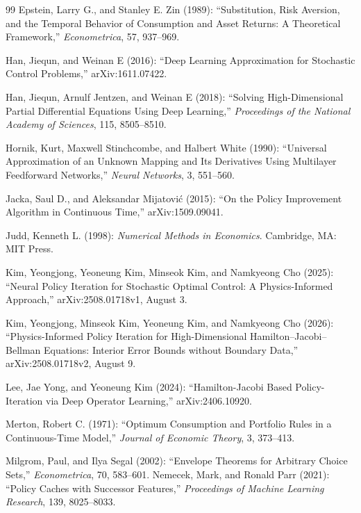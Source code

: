 \begin{thebibliography}{99}
Epstein, Larry G., and Stanley E. Zin (1989): ``Substitution, Risk Aversion, and the Temporal Behavior of Consumption and Asset Returns: A Theoretical Framework,'' \emph{Econometrica}, 57, 937--969.

Han, Jiequn, and Weinan E (2016): ``Deep Learning Approximation for Stochastic Control Problems,'' arXiv:1611.07422.

Han, Jiequn, Arnulf Jentzen, and Weinan E (2018): ``Solving High-Dimensional Partial Differential Equations Using Deep Learning,'' \emph{Proceedings of the National Academy of Sciences}, 115, 8505--8510.

Hornik, Kurt, Maxwell Stinchcombe, and Halbert White (1990): ``Universal Approximation of an Unknown Mapping and Its Derivatives Using Multilayer Feedforward Networks,'' \emph{Neural Networks}, 3, 551--560.

Jacka, Saul D., and Aleksandar Mijatovi\'c (2015): ``On the Policy Improvement Algorithm in Continuous Time,'' arXiv:1509.09041.

Judd, Kenneth L. (1998): \emph{Numerical Methods in Economics}. Cambridge, MA: MIT Press.

Kim, Yeongjong, Yeoneung Kim, Minseok Kim, and Namkyeong Cho (2025): ``Neural Policy Iteration for Stochastic Optimal Control: A Physics-Informed Approach,'' arXiv:2508.01718v1, August 3.

Kim, Yeongjong, Minseok Kim, Yeoneung Kim, and Namkyeong Cho (2026): ``Physics-Informed Policy Iteration for High-Dimensional Hamilton--Jacobi--Bellman Equations: Interior Error Bounds without Boundary Data,'' arXiv:2508.01718v2, August 9.

Lee, Jae Yong, and Yeoneung Kim (2024): ``Hamilton-Jacobi Based Policy-Iteration via Deep Operator Learning,'' arXiv:2406.10920.

Merton, Robert C. (1971): ``Optimum Consumption and Portfolio Rules in a Continuous-Time Model,'' \emph{Journal of Economic Theory}, 3, 373--413.

Milgrom, Paul, and Ilya Segal (2002): ``Envelope Theorems for Arbitrary Choice Sets,'' \emph{Econometrica}, 70, 583--601.
Nemecek, Mark, and Ronald Parr (2021): ``Policy Caches with Successor Features,'' \emph{Proceedings of Machine Learning Research}, 139, 8025--8033.


\end{thebibliography}
